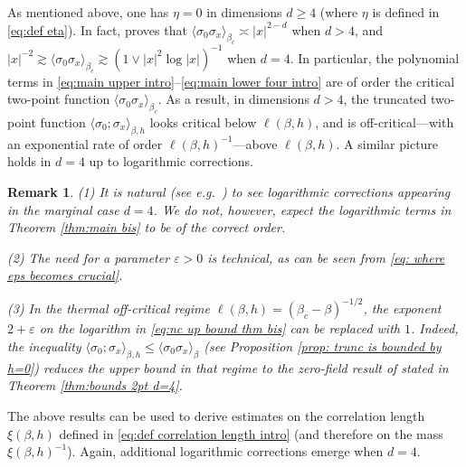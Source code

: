 \documentclass[10pt,a4paper]{amsart}
\numberwithin{equation}{section}
\newtheorem{Rem}[Thm]{Remark}
\begin{document}
As mentioned above, one has $\eta=0$ in dimensions $d\geq 4$ (where $\eta$ is defined in \eqref{eq:def eta}). In fact, \cite{DuminilPanis2024newLB} proves that $\langle \sigma_0\sigma_x\rangle_{\beta_c}\asymp |x|^{2-d}$ when $d>4$, and $|x|^{-2}\gtrsim \langle \sigma_0\sigma_x\rangle_{\beta_c}\gtrsim (1\vee |x|^2\log |x|)^{-1}$ when $d=4$. In particular, the polynomial terms in \eqref{eq:main upper intro}--\eqref{eq:main lower four intro} are of order the critical two-point function $\langle \sigma_0\sigma_x\rangle_{\beta_c}$. As a result, in dimensions $d>4$, the truncated two-point function $\langle \sigma_0;\sigma_x\rangle_{\beta,h}$ looks critical below $\ell(\beta,h)$, and is off-critical---with an exponential rate of order $\ell(\beta,h)^{-1}$---above $\ell(\beta,h)$. A similar picture holds in $d=4$ up to logarithmic corrections.
\begin{Rem}\hspace{-1pt}(1) It is natural (see e.g.~\cite{BauerschmidtBrydgesSlade2014Phi4fourdim,bauerschmidt2017finite}) to see logarithmic corrections appearing in the \emph{marginal} case $d=4$. We do not, however, expect the logarithmic terms in Theorem
\ref{thm:main bis} to be of the correct order. 

(2) The need for a parameter $\varepsilon>0$ is technical, as can be seen from \eqref{eq: where eps becomes crucial}.

(3)  In the thermal off-critical regime
$\ell(\beta,h)=(\beta_c-\beta)^{-1/2}$, the exponent $2+\varepsilon$ on the logarithm in
\eqref{eq:nc up bound thm bis} can be replaced with $1$.  Indeed, the inequality
    $\langle\sigma_0;\sigma_x\rangle_{\beta,h}
    \leq\langle\sigma_0\sigma_x\rangle_{\beta}$
(see Proposition \ref{prop: trunc is bounded by h=0}) reduces the upper bound in that regime to the zero-field result of
\cite{DuminilPanis2024newLB} stated in Theorem
\ref{thm:bounds 2pt d=4}.	
\end{Rem}


The above results can be used to derive estimates on the correlation length $\xi(\beta,h)$ defined in \eqref{eq:def correlation length intro} (and therefore on the mass $\xi(\beta,h)^{-1}$). Again, additional logarithmic corrections emerge when $d=4$.
\end{document}
